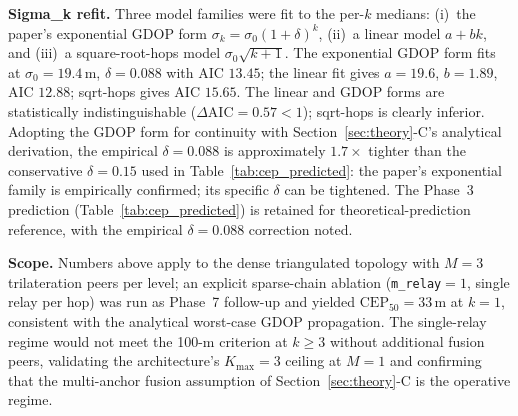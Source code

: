 \documentclass[journal,10pt,twocolumn]{IEEEtran}
\begin{document}
\textbf{Sigma\_k refit.} Three model families were fit to the per-$k$ medians: (i)~the paper's exponential GDOP form $\sigma_k=\sigma_0(1+\delta)^k$, (ii)~a linear model $a+bk$, and (iii)~a square-root-hops model $\sigma_0\sqrt{k+1}$. The exponential GDOP form fits at $\sigma_0=19.4$\,m, $\delta=0.088$ with AIC $13.45$; the linear fit gives $a=19.6$, $b=1.89$, AIC $12.88$; sqrt-hops gives AIC $15.65$. The linear and GDOP forms are statistically indistinguishable ($\Delta\text{AIC}=0.57<1$); sqrt-hops is clearly inferior. Adopting the GDOP form for continuity with Section~\ref{sec:theory}-C's analytical derivation, the empirical $\delta=0.088$ is approximately $1.7\times$ tighter than the conservative $\delta=0.15$ used in Table~\ref{tab:cep_predicted}: the paper's exponential family is empirically confirmed; its specific $\delta$ can be tightened. The Phase~3 prediction (Table~\ref{tab:cep_predicted}) is retained for theoretical-prediction reference, with the empirical $\delta=0.088$ correction noted.

\begin{table}[t]
\centering
\caption{Earlier analytical CEP prediction (retained for reference) using $\sigma_\text{base}{=}50$~m, $R_\text{anchor}=0.85$ ($\sigma_\text{anchor}\approx 58.1$~m), and conservative $\beta=0.15$. The empirical refit (Table~\ref{tab:cep_measured}, $\delta=0.088$) tightens the per-hop multiplier; absolute CEP magnitudes also shift downward because the empirical scaffold achieves CEP$_{50}{=}17$\,m at $k{=}0$ versus the conservative prior's 30--50\,m range.}
\label{tab:cep_predicted}
\small
{}
\end{table}

\textbf{Scope.} Numbers above apply to the dense triangulated topology with $M{=}3$ trilateration peers per level; an explicit sparse-chain ablation (\texttt{m\_relay}$=1$, single relay per hop) was run as Phase~7 follow-up and yielded $\text{CEP}_{50}=33$\,m at $k{=}1$, consistent with the analytical worst-case GDOP propagation. The single-relay regime would not meet the 100-m criterion at $k\geq 3$ without additional fusion peers, validating the architecture's $K_\text{max}{=}3$ ceiling at $M=1$ and confirming that the multi-anchor fusion assumption of Section~\ref{sec:theory}-C is the operative regime.
\end{document}
